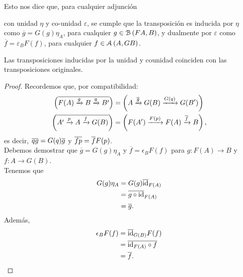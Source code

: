 Esto nos dice que, para cualquier adjunción 
\begin{center}
\end{center}
con unidad $\eta$ y co-unidad $\varepsilon$, se cumple que la transposición es inducida por $\eta$ como $\overline{g}=G(g)\eta_A$, para cualquier $g\in\mathcal{B}\left({FA,B}\right)$, y dualmente por $\varepsilon$ como $\overline{f}=\varepsilon_BF(f)$, para cualquier $f\in\mathcal{A}\left({A,GB}\right)$.
\begin{lemma}%
  Las transposiciones inducidas por la
  unidad y counidad coinciden con las transposiciones
  originales.
\end{lemma}
\begin{proof}
    Recordemos que, por compatibilidad:
    \begin{align*}
        \left(\overline{F(A)\xrightarrow{g} B \xrightarrow{q} B'}\right)
        &=
        \left(A\xrightarrow{\overline{g}} G(B) \xrightarrow{G(q)}G(B')\right) \\
        \left(\overline{A'\xrightarrow{p} A \xrightarrow{f} G(B)}\right)
        &=
        \left(F(A')\xrightarrow{F(p)} F(A) \xrightarrow{\overline{f}}B\right),
    \end{align*}
    es decir, $\overline{qg}=G(q)\overline{g}$ y $\overline{fp}=\overline{f} F(p)$.\\
    Debemos demostrar que $\overline{g}=G(g)\eta_A$ y $\overline{f}=\epsilon_BF(f)$ para $g\colon F(A)\to B$ y $f\colon A\to G(B)$.\\
Tenemos que
\begin{align*}
G(g)\eta_A&=G(g)\overline{\mathrm{id}}_{F(A)}\\
&=\overline{g\circ \mathrm{id}}_{F(A)}\\
&=\overline{g}.
\end{align*}
Además, 
\begin{align*}
\epsilon_B F(f)&=\overline{\mathrm{id}}_{G(B)}F(f)\\
&=\overline{\mathrm{id}_{F(A)}\circ f}\\
&=\overline{f}.
\end{align*}
\end{proof}



